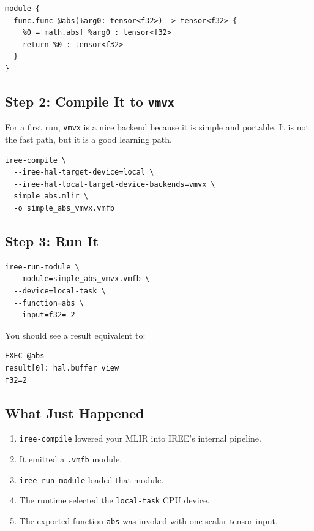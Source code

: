 \documentclass[11pt,a4paper]{article}
\begin{document}
\begin{lstlisting}[caption=A minimal IREE-friendly MLIR example]
module {
  func.func @abs(%arg0: tensor<f32>) -> tensor<f32> {
    %0 = math.absf %arg0 : tensor<f32>
    return %0 : tensor<f32>
  }
}
\end{lstlisting}

\subsection{Step 2: Compile It to \texttt{vmvx}}

For a first run, \texttt{vmvx} is a nice backend because it is simple and portable. It is not the fast path, but it is a good learning path.

\begin{lstlisting}[caption=Compile the program to a VMFB using VMVX]
iree-compile \
  --iree-hal-target-device=local \
  --iree-hal-local-target-device-backends=vmvx \
  simple_abs.mlir \
  -o simple_abs_vmvx.vmfb
\end{lstlisting}

\subsection{Step 3: Run It}

\begin{lstlisting}[caption=Execute the exported function]
iree-run-module \
  --module=simple_abs_vmvx.vmfb \
  --device=local-task \
  --function=abs \
  --input=f32=-2
\end{lstlisting}

You should see a result equivalent to:

\begin{lstlisting}[caption=Expected shape of the output]
EXEC @abs
result[0]: hal.buffer_view
f32=2
\end{lstlisting}

\subsection{What Just Happened}

\begin{enumerate}
    \item \texttt{iree-compile} lowered your MLIR into IREE's internal pipeline.
    \item It emitted a \texttt{.vmfb} module.
    \item \texttt{iree-run-module} loaded that module.
    \item The runtime selected the \texttt{local-task} CPU device.
    \item The exported function \texttt{abs} was invoked with one scalar tensor input.
\end{enumerate}
\end{document}
